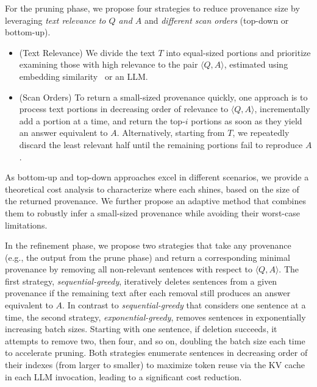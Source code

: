 For the pruning phase, 
we propose four strategies 
to reduce provenance size 
by leveraging {\em text relevance to $Q$ and $A$} and {\em different scan orders} (top-down or bottom-up).  
\vspace{-1mm}
\begin{itemize}[leftmargin=*]
    \item (Text Relevance) We divide the text $T$ into equal-sized portions and prioritize examining those with high relevance to the pair $\langle Q,A \rangle$, estimated using embedding similarity~\cite{caspari2024beyond} or an LLM. 
    \item (Scan Orders) To return a small-sized provenance quickly, one approach is to process text portions in decreasing order of relevance to $\langle Q,A \rangle$, incrementally add a portion at a time, and return the top‑$i$ portions as soon as they yield an answer equivalent to $A$.    
    Alternatively, starting from $T$, we repeatedly discard the least relevant half until the remaining portions fail to reproduce $A$. 
\end{itemize}
\vspace{-1mm}
As bottom-up and top-down approaches excel in different scenarios, we provide a theoretical cost analysis to characterize where each shines, based on the size of the returned provenance. We further propose an adaptive method that combines them to robustly infer a small-sized provenance while avoiding their worst-case limitations. 

In the refinement phase, we propose two strategies that take any provenance (e.g., the output from the prune phase) 
and  return a corresponding 
minimal provenance by removing 
all non-relevant sentences 
with respect to $\langle Q, A\rangle$. 
The first strategy, {\em sequential-greedy}, 
iteratively deletes sentences 
from a given provenance 
if the remaining text after each removal 
still produces an answer equivalent to $A$. 
In contrast to {\em sequential-greedy} 
that considers one sentence at a time, the second strategy, 
{\em exponential-greedy}, removes sentences in exponentially increasing batch sizes. Starting with one sentence, if deletion succeeds, it attempts to remove two, then four, and so on, doubling the batch size each time to accelerate pruning. Both strategies enumerate sentences in decreasing order of their indexes (from larger to smaller) to maximize token reuse via the KV cache in each LLM invocation, leading to a significant cost reduction. 

